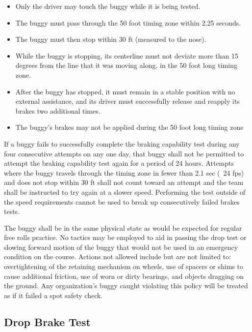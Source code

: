 	\begin{itemize}

		\item
		Only the driver may touch the buggy while it is being tested.

		\item
		The buggy must pass through the 50 foot timing zone within 2.25 seconds.

		\item
		The buggy must then stop within 30 ft (measured to the nose).

		\item
		While the buggy is stopping, its centerline must not deviate more than 15 degrees from the line that it was moving along, in the 50 foot long timing zone.


		\item
		After the buggy has stopped, it must remain in a stable position with no external assistance, and its driver must successfully release and reapply its brakes two additional times.


		\item
		The buggy's brakes may not be applied during the 50 foot long timing zone

	\end{itemize}

	If a buggy fails to successfully complete the braking capability test during any four consecutive attempts on any one day, that buggy shall not be permitted to attempt the braking capability test again for a period
	of 24 hours. Attempts where the buggy travels through the timing zone in fewer than 2.1 sec (~24 fps) and does not stop within 30 ft shall not count toward an attempt and the team shall be instructed to try again at a slower speed. Performing the test outside of the speed requirements cannot be used to break up consecutively failed brakes tests. 
	
	The buggy shall be in the same physical state as would be expected for regular free rolls practice. No tactics may be employed to aid in passing the drop test or slowing forward motion of the buggy that would not be used in an emergency condition on the course. Actions not allowed include but are not limited to: overtightening of the retaining mechanism on wheels, use of spacers or shims to cause additional friction, use of worn or dirty bearings, and objects dragging on the ground. Any organization's buggy caught violating this policy will be treated as if it failed a spot safety check.

\subsection{Drop Brake Test}

